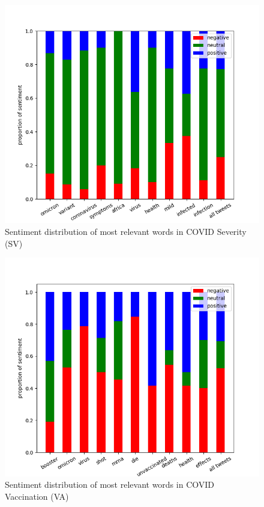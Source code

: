 \documentclass[letterpaper]{article} %
\begin{document}
\begin{figure}[H]
    \centering
    \includegraphics[scale=0.45]{SV_word_sentiment.png}
    \caption{Sentiment distribution of most relevant words in COVID Severity (SV)}
    \label{fig:sv-dist}
\end{figure}
\begin{figure}[H]
    \centering
    \includegraphics[scale=0.45]{VA_word_sentiment.png}
    \caption{Sentiment distribution of most relevant words in COVID Vaccination (VA)}
    \label{fig:va-dist}
\end{figure}
\end{document}
